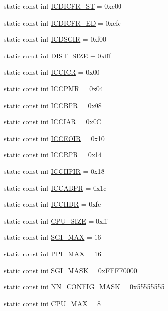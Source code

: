 \begin{DoxyCompactItemize}
\item 
static const int \hyperlink{classPl390_ada234b18d9cde5ac83bbea077bc269de}{ICDICFR\_\-ST} = 0xc00
\item 
static const int \hyperlink{classPl390_ab23fa73d7d71a9d54ac1ea1ff4661770}{ICDICFR\_\-ED} = 0xcfc
\item 
static const int \hyperlink{classPl390_ab757c4be11b50f9a009aa08c958ea058}{ICDSGIR} = 0xf00
\item 
static const int \hyperlink{classPl390_a0a6bf9b44fc240861af4c98cb13b212b}{DIST\_\-SIZE} = 0xfff
\item 
static const int \hyperlink{classPl390_acb144a8d8dc35a2e9060d96bc329fa60}{ICCICR} = 0x00
\item 
static const int \hyperlink{classPl390_a00368b6d72a37a6a7f42e7922d289e76}{ICCPMR} = 0x04
\item 
static const int \hyperlink{classPl390_ace280dd5776899099ebfe4f7b7bbc01f}{ICCBPR} = 0x08
\item 
static const int \hyperlink{classPl390_a15b9d48b0d0fe3e5f21d98c5b3579e98}{ICCIAR} = 0x0C
\item 
static const int \hyperlink{classPl390_a3ab6be2302e161f611641bcb679f70c4}{ICCEOIR} = 0x10
\item 
static const int \hyperlink{classPl390_a0d94eb1e4c2f76f0bf84221f0862c6ae}{ICCRPR} = 0x14
\item 
static const int \hyperlink{classPl390_a39d3ddf778fa125d6e9aa3183a72cd06}{ICCHPIR} = 0x18
\item 
static const int \hyperlink{classPl390_a0d8e9d466c4efc33cfd7dc2fd2eb59eb}{ICCABPR} = 0x1c
\item 
static const int \hyperlink{classPl390_ae00448ead7cf78b11d87238f956b1532}{ICCIIDR} = 0xfc
\item 
static const int \hyperlink{classPl390_a628e4ead2feec06369292346fb8867d8}{CPU\_\-SIZE} = 0xff
\item 
static const int \hyperlink{classPl390_ab882d232a4976cf54e9cb73b44e1988f}{SGI\_\-MAX} = 16
\item 
static const int \hyperlink{classPl390_a5ff528d1355008104939d20af447bac8}{PPI\_\-MAX} = 16
\item 
static const int \hyperlink{classPl390_a5a2357b28c8821b1d9da7fc86a2e1e46}{SGI\_\-MASK} = 0xFFFF0000
\item 
static const int \hyperlink{classPl390_a7595fc36770609b9fef1a639ce0b3c84}{NN\_\-CONFIG\_\-MASK} = 0x55555555
\item 
static const int \hyperlink{classPl390_a4b102c882c8ecd5172c3f918fcde9c6d}{CPU\_\-MAX} = 8

\end{DoxyCompactItemize}

